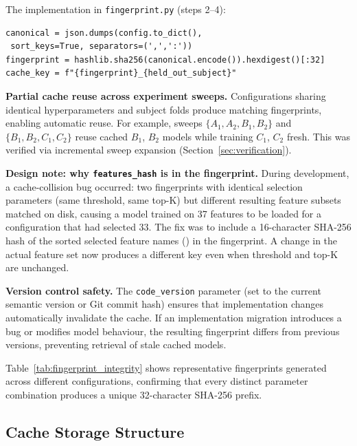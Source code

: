 The implementation in \texttt{fingerprint.py} (steps 2--4):

\begin{verbatim}
canonical = json.dumps(config.to_dict(),
 sort_keys=True, separators=(',',':'))
fingerprint = hashlib.sha256(canonical.encode()).hexdigest()[:32]
cache_key = f"{fingerprint}_{held_out_subject}"
\end{verbatim}

\textbf{Partial cache reuse across experiment sweeps.} Configurations sharing
identical hyperparameters and subject folds produce matching fingerprints,
enabling automatic reuse. For example, sweeps $\{A_1, A_2, B_1, B_2\}$ and
$\{B_1, B_2, C_1, C_2\}$ reuse cached $B_1$, $B_2$ models while training
$C_1$, $C_2$ fresh. This was verified via incremental sweep expansion
(Section~\ref{sec:verification}).

\textbf{Design note: why \texttt{features\_hash} is in the fingerprint.}
During development, a cache-collision bug occurred: two fingerprints with
identical selection parameters (same threshold, same top-K) but different
resulting feature subsets matched on disk, causing a model trained on 37
features to be loaded for a configuration that had selected 33. The fix was
to include a 16-character SHA-256 hash of the sorted selected feature names
() in the fingerprint. A change in the actual feature
set now produces a different key even when threshold and top-K are unchanged.

\textbf{Version control safety.} The \texttt{code\_version} parameter
(set to the current semantic version or Git commit hash) ensures that
implementation changes automatically invalidate the cache. If an implementation
migration introduces a bug or modifies model behaviour, the resulting fingerprint
differs from previous versions, preventing retrieval of stale cached
models.

Table~\ref{tab:fingerprint_integrity} shows representative fingerprints generated
across different configurations, confirming that every distinct parameter combination
produces a unique 32-character SHA-256 prefix.



\subsection{Cache Storage Structure}

